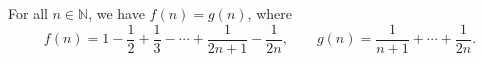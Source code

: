 For all $n \in \mathbb{N}$, we have $f(n) = g(n)$, where
\[ f(n) = 1 - \frac{1}{2} + \frac{1}{3} - \cdots + \frac{1}{2n + 1} - \frac{1}{2n},\qquad g(n) = \frac{1}{n + 1} + \cdots + \frac{1}{2n}. \]

